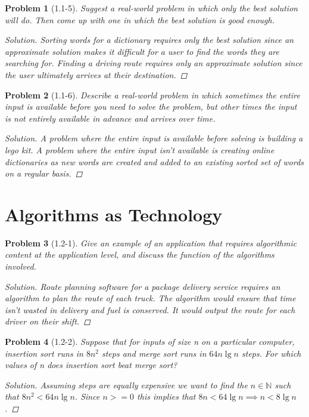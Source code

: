 \documentclass[oneside]{book}
\newtheorem{problem}{Problem}
\begin{document}
\begin{spacing}{1.618}
\begin{problem}[1.1-5]
		Suggest a real-world problem in which only the best solution will do. Then come up with one in which the best solution is good enough.
	\begin{proof}[Solution]
		Sorting words for a dictionary requires only the best solution since an approximate solution makes it difficult for a user to find the words they are searching for. Finding a driving route requires only an approximate solution since the user ultimately arrives at their destination. 
	\end{proof}
\end{problem}

\begin{problem}[1.1-6]
	Describe a real-world problem in which sometimes the entire input is available before you need to solve the problem, but other times the input is not entirely available in advance and arrives over time.
	\begin{proof}[Solution]
		A problem where the entire input is available before solving is building a lego kit. A problem where the entire input isn't available is creating online dictionaries as new words are created and added to an existing sorted set of words on a regular basis. 
	\end{proof}
\end{problem}

\section{Algorithms as Technology}

\begin{problem}[1.2-1]
	Give an example of an application that requires algorithmic content at the application level, and discuss the function of the algorithms involved.
	\begin{proof}[Solution]
		Route planning software for a package delivery service requires an algorithm to plan the route of each truck. The algorithm would ensure that time isn't wasted in delivery and fuel is conserved. It would output the route for each driver on their shift. 
	\end{proof}
\end{problem}

\begin{problem}[1.2-2]
	Suppose that for inputs of size n on a particular computer, insertion sort runs in $8n^2$ steps and merge sort runs in $64n\lg{n}$ steps. For which values of n does insertion sort beat merge sort?
	\begin{proof}[Solution]
		Assuming steps are equally expensive we want to find the $n\in\mathbb{N}$ such that $8n^2 < 64n\lg{n}$. Since $n>=0$ this implies that $8n < 64\lg{n}\implies n < 8\lg{n}$. 
		

\end{proof}
\end{problem}
\end{spacing}
\end{document}
